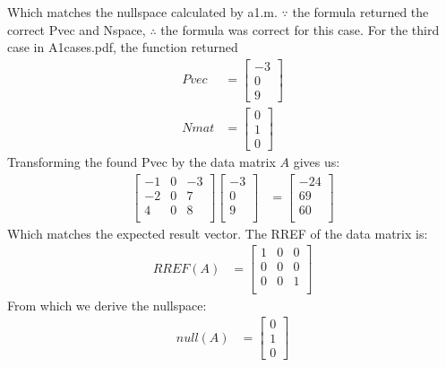 \documentclass{article}
\begin{document}
	Which matches the nullspace calculated by a1.m. $\because$ the formula returned the correct Pvec and Nspace, $\therefore$ the formula was correct for this case. For the third case in A1cases.pdf, the function returned
		\begin{align*}
			Pvec &= \left[\begin{matrix}
				-3\\
				0\\
				9
			\end{matrix}\right]\\
			Nmat &= \left[\begin{matrix}
				0\\
				1\\
				0
			\end{matrix}\right]
		\end{align*}
	Transforming the found Pvec by the data matrix $A$ gives us:
		\begin{align*}
			\left[\begin{matrix}
				-1 & 0 & -3\\
				-2 & 0 & 7\\
				4 & 0 & 8\\
			\end{matrix}\right]\left[\begin{matrix}
				-3\\
				0\\
				9\\
			\end{matrix}\right] &= \left[\begin{matrix}
				-24\\
				69\\
				60\\
			\end{matrix}\right]
		\end{align*}
	Which matches the expected result vector. The RREF of the data matrix is:
		\begin{align*}
			RREF(A) &= \left[\begin{matrix}
				1 & 0 & 0\\
				0 & 0 & 0\\
				0 & 0 & 1\\
			\end{matrix}\right]
		\end{align*}
	From which we derive the nullspace:
		\begin{align*}
			null(A) &= \left[\begin{matrix}	
				0\\
				1\\
				0
			\end{matrix}\right]
		\end{align*}
\end{document}

